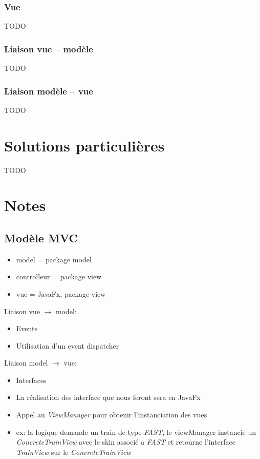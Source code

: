 \documentclass[report, backcover, french, nodocumentinfo]{upmethodology-document}
\begin{document}
		\subsection{Vue}
			TODO
		\subsection{Liaison vue -- modèle}
			TODO
		\subsection{Liaison modèle -- vue}
			TODO

	\chapter{Solutions particulières}
		TODO

	\chapter{Notes}
		\section{Modèle MVC}
			\begin{itemize}
				\item model = package model
				\item controlleur = package view
				\item vue = JavaFx, package view
			\end{itemize}
			Liaison vue $\rightarrow$ model:
			\begin{itemize}
				\item Events
				\item Utilisation d'un event dispatcher
			\end{itemize}
			Liaison model $\rightarrow$ vue:
			\begin{itemize}
				\item Interfaces
				\item La réalisation des interface que nous feront sera en JavaFx
				\item Appel au \textit{ViewManager} pour obtenir l'instanciation des vues
				\item ex: la logique demande un train de type \textit{FAST}, le viewManager instancie un \textit{ConcreteTrainView} avec le skin associé a \textit{FAST} et retourne l'interface \textit{TrainView} sur le \textit{ConcreteTrainView}
			\end{itemize}
\end{document}
